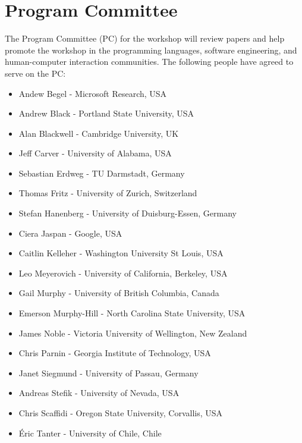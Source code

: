 \documentclass{sigplanconf}
\begin{document}
\section{Program Committee}

The Program Committee (PC) for the workshop will review papers and help promote the workshop in the programming languages, software engineering, and human-computer interaction communities. The following people have agreed to serve on the PC:

\begin{itemize}
\item Andew Begel - Microsoft Research, USA
\item Andrew Black - Portland State University, USA
\item Alan Blackwell - Cambridge University, UK
\item Jeff Carver - University of Alabama, USA
\item Sebastian Erdweg - TU Darmstadt, Germany
\item Thomas Fritz - University of Zurich, Switzerland
\item Stefan Hanenberg - University of Duisburg-Essen, Germany
\item Ciera Jaspan - Google, USA
\item Caitlin Kelleher - Washington University St Louis, USA
\item Leo Meyerovich - University of California, Berkeley, USA
\item Gail Murphy - University of British Columbia, Canada
\item Emerson Murphy-Hill - North Carolina State University, USA
\item James Noble - Victoria University of Wellington, New Zealand
\item Chris Parnin - Georgia Institute of Technology, USA
\item Janet Siegmund - University of Passau, Germany
\item Andreas Stefik - University of Nevada, USA
\item Chris Scaffidi - Oregon State University, Corvallis, USA
\item \'Eric Tanter - University of Chile, Chile
\end{itemize}
\end{document}
